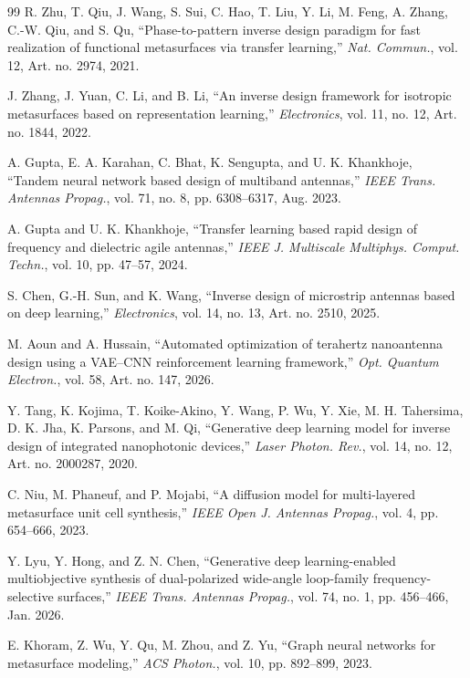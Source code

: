 \documentclass[journal]{IEEEtran}
\begin{document}
\begin{thebibliography}{99}
 R. Zhu, T. Qiu, J. Wang, S. Sui, C. Hao, T. Liu, Y. Li, M. Feng, A. Zhang, C.-W. Qiu, and S. Qu, ``Phase-to-pattern inverse design paradigm for fast realization of functional metasurfaces via transfer learning,'' \textit{Nat. Commun.}, vol. 12, Art. no. 2974, 2021.

 J. Zhang, J. Yuan, C. Li, and B. Li, ``An inverse design framework for isotropic metasurfaces based on representation learning,'' \textit{Electronics}, vol. 11, no. 12, Art. no. 1844, 2022.

 A. Gupta, E. A. Karahan, C. Bhat, K. Sengupta, and U. K. Khankhoje, ``Tandem neural network based design of multiband antennas,'' \textit{IEEE Trans. Antennas Propag.}, vol. 71, no. 8, pp. 6308--6317, Aug. 2023.

 A. Gupta and U. K. Khankhoje, ``Transfer learning based rapid design of frequency and dielectric agile antennas,'' \textit{IEEE J. Multiscale Multiphys. Comput. Techn.}, vol. 10, pp. 47--57, 2024.

 S. Chen, G.-H. Sun, and K. Wang, ``Inverse design of microstrip antennas based on deep learning,'' \textit{Electronics}, vol. 14, no. 13, Art. no. 2510, 2025.

 M. Aoun and A. Hussain, ``Automated optimization of terahertz nanoantenna design using a VAE--CNN reinforcement learning framework,'' \textit{Opt. Quantum Electron.}, vol. 58, Art. no. 147, 2026.

 Y. Tang, K. Kojima, T. Koike-Akino, Y. Wang, P. Wu, Y. Xie, M. H. Tahersima, D. K. Jha, K. Parsons, and M. Qi, ``Generative deep learning model for inverse design of integrated nanophotonic devices,'' \textit{Laser Photon. Rev.}, vol. 14, no. 12, Art. no. 2000287, 2020.

 C. Niu, M. Phaneuf, and P. Mojabi, ``A diffusion model for multi-layered metasurface unit cell synthesis,'' \textit{IEEE Open J. Antennas Propag.}, vol. 4, pp. 654--666, 2023.

 Y. Lyu, Y. Hong, and Z. N. Chen, ``Generative deep learning-enabled multiobjective synthesis of dual-polarized wide-angle loop-family frequency-selective surfaces,'' \textit{IEEE Trans. Antennas Propag.}, vol. 74, no. 1, pp. 456--466, Jan. 2026.

 E. Khoram, Z. Wu, Y. Qu, M. Zhou, and Z. Yu, ``Graph neural networks for metasurface modeling,'' \textit{ACS Photon.}, vol. 10, pp. 892--899, 2023.


\end{thebibliography}
\end{document}
